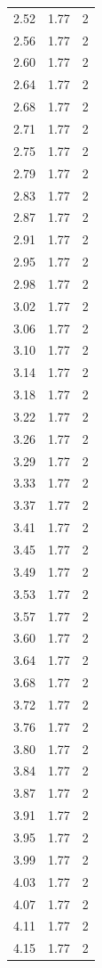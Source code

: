 \begin{longtable}{lrr}
  2.52 & 1.77 & 2 \\
  2.56 & 1.77 & 2 \\
  2.60 & 1.77 & 2 \\
  2.64 & 1.77 & 2 \\
  2.68 & 1.77 & 2 \\
  2.71 & 1.77 & 2 \\
  2.75 & 1.77 & 2 \\
  2.79 & 1.77 & 2 \\
  2.83 & 1.77 & 2 \\
  2.87 & 1.77 & 2 \\
  2.91 & 1.77 & 2 \\
  2.95 & 1.77 & 2 \\
  2.98 & 1.77 & 2 \\
  3.02 & 1.77 & 2 \\
  3.06 & 1.77 & 2 \\
  3.10 & 1.77 & 2 \\
  3.14 & 1.77 & 2 \\
  3.18 & 1.77 & 2 \\
  3.22 & 1.77 & 2 \\
  3.26 & 1.77 & 2 \\
  3.29 & 1.77 & 2 \\
  3.33 & 1.77 & 2 \\
  3.37 & 1.77 & 2 \\
  3.41 & 1.77 & 2 \\
  3.45 & 1.77 & 2 \\
  3.49 & 1.77 & 2 \\
  3.53 & 1.77 & 2 \\
  3.57 & 1.77 & 2 \\
  3.60 & 1.77 & 2 \\
  3.64 & 1.77 & 2 \\
  3.68 & 1.77 & 2 \\
  3.72 & 1.77 & 2 \\
  3.76 & 1.77 & 2 \\
  3.80 & 1.77 & 2 \\
  3.84 & 1.77 & 2 \\
  3.87 & 1.77 & 2 \\
  3.91 & 1.77 & 2 \\
  3.95 & 1.77 & 2 \\
  3.99 & 1.77 & 2 \\
  4.03 & 1.77 & 2 \\
  4.07 & 1.77 & 2 \\
  4.11 & 1.77 & 2 \\
  4.15 & 1.77 & 2 \\

\end{longtable}
